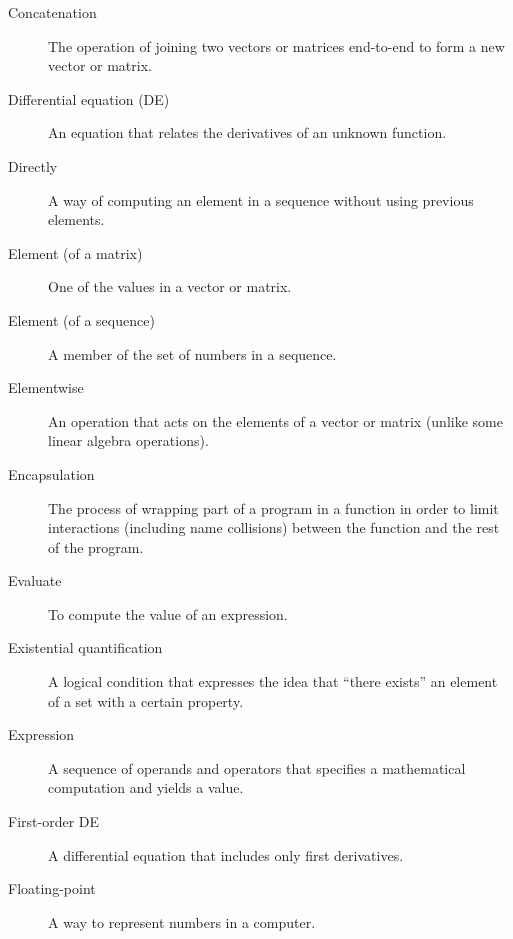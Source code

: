\begin{description}
\item[Concatenation] The operation of joining two vectors or matrices end-to-end to
form a new vector or matrix.


\item[Differential equation (DE)] An equation that relates the
derivatives of an unknown function.

\item[Directly] A way of computing an element in a sequence without
using previous elements.



\item[Element (of a matrix)] One of the values in a vector or matrix.

\item[Element (of a sequence)] A member of the set of numbers in a sequence.

\item[Elementwise] An operation that acts on the elements
of a vector or matrix (unlike some linear algebra operations).

\item[Encapsulation] The process of wrapping part of a program in
a function in order to limit interactions (including name collisions)
between the function and the rest of the program.

\item[Evaluate] To compute the value of an expression.

\item[Existential quantification] A logical condition that expresses the idea that ``there exists'' an element of a set with a certain property.

\item[Expression] A sequence of operands and operators that specifies
a mathematical computation and yields a value.

\item[First-order DE] A differential equation that includes only first derivatives.

\item[Floating-point] A way to represent numbers in a computer.


\end{description}
